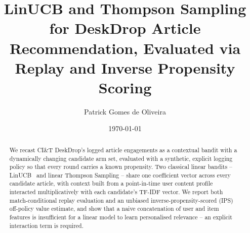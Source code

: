 \documentclass[10pt,twocolumn]{article}
\title{LinUCB and Thompson Sampling for DeskDrop Article Recommendation, Evaluated via Replay and Inverse Propensity Scoring}
\author{Patrick Gomes de Oliveira}
\date{\today}
\begin{document}
\maketitle
\begin{abstract}
We recast CI\&T DeskDrop's logged article engagements as a contextual
bandit with a dynamically changing candidate arm set, evaluated with a
synthetic, explicit logging policy so that every round carries a known
propensity. Two classical linear bandits -- LinUCB~\cite{li2010linucb} and
linear Thompson Sampling -- share one coefficient vector across every
candidate article, with context built from a point-in-time user content
profile interacted multiplicatively with each candidate's TF-IDF vector.
We report both match-conditional replay evaluation and an unbiased
inverse-propensity-scored (IPS) off-policy value estimate, and show that a
naive concatenation of user and item features is insufficient for a linear
model to learn personalised relevance -- an explicit interaction term is
required.
\end{abstract}









\end{document}
